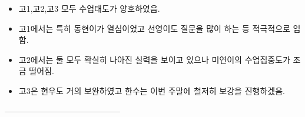 \documentclass[idxtotoc,hyperref,openany]{labbook} %
\begin{document}

\begin{itemize}
	\item 고1,고2,고3 모두 수업태도가 양호하였음.
	\item 고1에서는 특히 동현이가 열심이었고 선영이도 질문을 많이 하는 등 적극적으로 임함.
	\item 고2에서는 둘 모두 확실히 나아진 실력을 보이고 있으나 미연이의 수업집중도가 조금 떨어짐.
	\item 고3은 현우도 거의 보완하였고 한수는 이번 주말에 철저히 보강을 진행하겠음.
\end{itemize}





------------------------------------------










\end{document}
